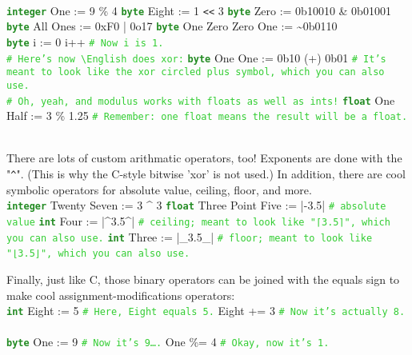\documentclass{article}
\newcommand{\English}{\textbackslash{}English}				%
\newcommand{\codecomment}[1]{\texttt{\textcolor{LimeGreen}{#1}}}
\newcommand{\commentline}[1]{\codecomment{\# #1}}
\newcommand{\type}[1]{\texttt{\textcolor{ForestGreen}{\textbf{#1}}}}
\newenvironment{code}[0]
{\ttfamily{}				%
\setlength\parindent{0cm}	%
~\\}
{\setlength\parindent{1cm}
~\\}
\begin{document}
\begin{code}
\type{integer} One := 9 \% 4
\type{byte} Eight := 1 \verb+<<+ 3
\type{byte} Zero := 0b10010 \& 0b01001
\type{byte} All Ones := 0xF0 | 0o17
\type{byte} One Zero Zero One := \textasciitilde{}0b0110\\

\type{byte} i := 0
i++	\commentline{Now i is 1.}\\

\commentline{Here's now \English{} does xor:}
\type{byte} One One := 0b10 (+) 0b01 \commentline{It's meant to look like the xor circled plus symbol, which you can also use.}\\

\commentline{Oh, yeah, and modulus works with floats as well as ints!}
\type{float} One Half := 3 \% 1.25	\commentline{Remember: one float means the result will be a float.}
\end{code}

\indent There are lots of custom arithmatic operators, too! Exponents are done with the "\texttt{\^}". (This is why the C-style bitwise 'xor' is not used.) In addition, there are cool symbolic operators for absolute value, ceiling, floor, and more.
\begin{code}
\type{integer} Twenty Seven := 3 \^{} 3
\type{float} Three Point Five := |-3.5|	\commentline{absolute value}
\type{int} Four := |\^{}3.5\^{}| \commentline{ceiling; meant to look like "⌈3.5⌉", which you can also use.}
\type{int} Three := |\_3.5\_| \commentline{floor; meant to look like "⌊3.5⌋", which you can also use.}
\end{code}

\indent Finally, just like C, those binary operators can be joined with the equals sign to make cool assignment-modifications operators:
\begin{code}
\type{int} Eight := 5	\commentline{Here, Eight equals 5.}
Eight += 3	\commentline{Now it's actually 8.}
~\\
\type{byte} One := 9	\commentline{Now it's 9\ldots.}
One \%= 4	\commentline{Okay, now it's 1.}
\end{code}
\end{document}
